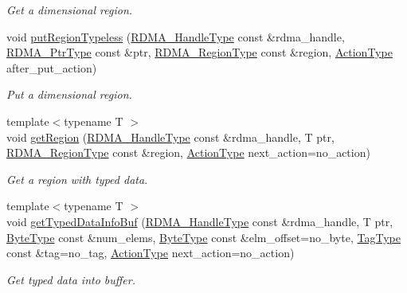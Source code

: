 \begin{DoxyCompactItemize}
\begin{DoxyCompactList}\small\item\em Get a dimensional region. \end{DoxyCompactList}\item 
void \hyperlink{structvt_1_1rdma_1_1_r_d_m_a_manager_a2e34becca8d5f72a7d460e6574f8f623}{put\+Region\+Typeless} (\hyperlink{namespacevt_a10442579ec4e7ebef223818e64bcf908}{R\+D\+M\+A\+\_\+\+Handle\+Type} const \&rdma\+\_\+handle, \hyperlink{namespacevt_a9e2c953286c7616f7c218e9951790776}{R\+D\+M\+A\+\_\+\+Ptr\+Type} const \&ptr, \hyperlink{structvt_1_1rdma_1_1_r_d_m_a_manager_aafc574f533ebf5b34c1389ef504448bf}{R\+D\+M\+A\+\_\+\+Region\+Type} const \&region, \hyperlink{namespacevt_ae0a5a7b18cc99d7b732cb4d44f46b0f3}{Action\+Type} after\+\_\+put\+\_\+action)
\begin{DoxyCompactList}\small\item\em Put a dimensional region. \end{DoxyCompactList}\item 
{\footnotesize template$<$typename T $>$ }\\void \hyperlink{structvt_1_1rdma_1_1_r_d_m_a_manager_a06506f3abad91d02456d88f4b1e4db1b}{get\+Region} (\hyperlink{namespacevt_a10442579ec4e7ebef223818e64bcf908}{R\+D\+M\+A\+\_\+\+Handle\+Type} const \&rdma\+\_\+handle, T ptr, \hyperlink{structvt_1_1rdma_1_1_r_d_m_a_manager_aafc574f533ebf5b34c1389ef504448bf}{R\+D\+M\+A\+\_\+\+Region\+Type} const \&region, \hyperlink{namespacevt_ae0a5a7b18cc99d7b732cb4d44f46b0f3}{Action\+Type} next\+\_\+action=no\+\_\+action)
\begin{DoxyCompactList}\small\item\em Get a region with typed data. \end{DoxyCompactList}\item 
{\footnotesize template$<$typename T $>$ }\\void \hyperlink{structvt_1_1rdma_1_1_r_d_m_a_manager_a267d1a2da52abf259119da964b9051f0}{get\+Typed\+Data\+Info\+Buf} (\hyperlink{namespacevt_a10442579ec4e7ebef223818e64bcf908}{R\+D\+M\+A\+\_\+\+Handle\+Type} const \&rdma\+\_\+handle, T ptr, \hyperlink{namespacevt_aab8d55968084610ce3b17057981e9300}{Byte\+Type} const \&num\+\_\+elems, \hyperlink{namespacevt_aab8d55968084610ce3b17057981e9300}{Byte\+Type} const \&elm\+\_\+offset=no\+\_\+byte, \hyperlink{namespacevt_a84ab281dae04a52a4b243d6bf62d0e52}{Tag\+Type} const \&tag=no\+\_\+tag, \hyperlink{namespacevt_ae0a5a7b18cc99d7b732cb4d44f46b0f3}{Action\+Type} next\+\_\+action=no\+\_\+action)
\begin{DoxyCompactList}\small\item\em Get typed data into buffer. \end{DoxyCompactList}\item 

\end{DoxyCompactItemize}
